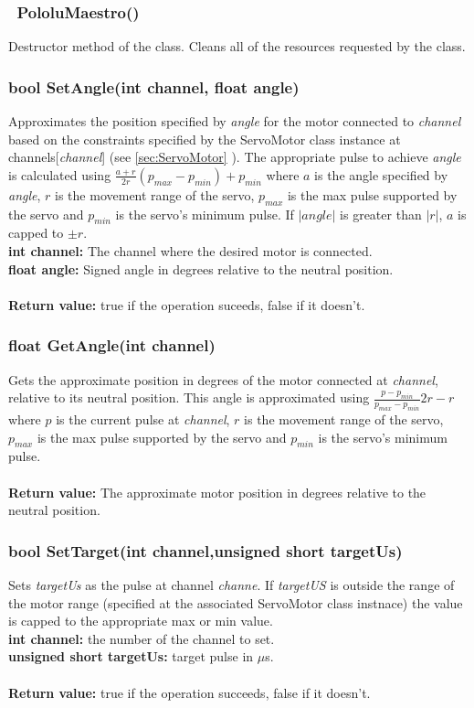 \documentclass[letterpaper]{book}
\begin{document}
\subsubsection{~PololuMaestro()}
Destructor method of the class. Cleans all of the resources requested by the class.\\

\subsubsection{	bool SetAngle(int channel, float angle)}
Approximates the position specified by \textit{angle} for the motor connected to \textit{channel} based on the constraints specified by the ServoMotor class instance at channels[\textit{channel}] (see \ref{sec:ServoMotor} ). The appropriate pulse to achieve \textit{angle} is calculated using $\frac{a+r}{2r}(p_{max} - p_{min}) + p_{min}$ where $a$ is the angle specified by \textit{angle}, $r$ is the movement range of the servo, $p_{max}$ is the max pulse supported by the servo and $p_{min}$ is the servo's minimum pulse. If $\left|angle\right|$ is greater than $\left|r\right|$, $a$ is capped to $\pm r$.\\
\textbf{int channel: }The channel where the desired motor is connected.\\
\textbf{float angle: } Signed angle in degrees relative to the neutral position.\\\\
\textbf{Return value: }true if the operation suceeds, false if it doesn't.\\

\subsubsection{float GetAngle(int channel)}
Gets the approximate position in degrees of the motor connected at \textit{channel}, relative to its neutral position. This angle is approximated using $\frac{p - p_{min}}{p_{max}-p_{min}}2r - r$  where $p$ is the current pulse at \textit{channel}, $r$ is the movement range of the servo, $p_{max}$ is the max pulse supported by the servo and $p_{min}$ is the servo's minimum pulse.\\\\
\textbf{Return value:} The approximate motor position in degrees relative to the neutral position.

\subsubsection{bool SetTarget(int channel,unsigned short targetUs)}
Sets \textit{targetUs} as the pulse at channel \textit{channe}. If \textit{targetUS} is outside the range of the motor range (specified at the associated ServoMotor class instnace) the value is capped to the appropriate max or min value.\\
\textbf{int channel: }the number of the channel to set.\\
\textbf{unsigned short targetUs: } target pulse in $\mu$s.\\\\
\textbf{Return value: } true if the operation succeeds, false if it doesn't.
\end{document}
